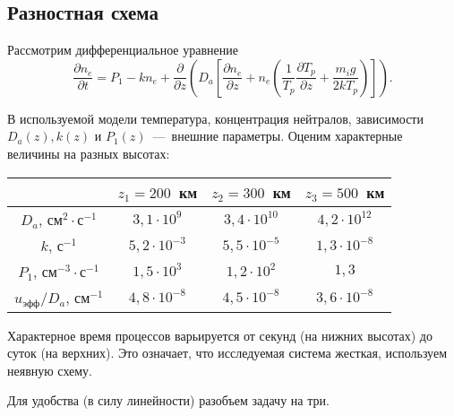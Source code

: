 \documentclass[12pt, a5paper, fleqn, twoside]{article}
\theoremstyle{definiton}
\theoremstyle{definition}
\begin{document}
\subsection*{Разностная схема}

Рассмотрим дифференциальное уравнение $$\dfrac{\partial n_e}{\partial t}=P_1-kn_e + \dfrac{\partial}{\partial z}\left(D_a\left[\dfrac{\partial n_e}{\partial z}+n_e\left(\dfrac{1}{T_p}\dfrac{\partial T_p}{\partial z}+\dfrac{m_ig}{2kT_p}\right)\right]\right).$$

В используемой модели температура, концентрация нейтралов, зависимости $D_a(z), k(z)$ и $P_1(z)$~---~внешние параметры. Оценим характерные величины на разных высотах:

\smallskip

\begin{tabular}{|c|c|c|c|}
\hline
&$z_1=200$~км&$z_2=300$~км&$z_3=500$~км\\
\hline
$D_a$, см$^{2}\cdot$с$^{-1}$&$3{,}1\cdot 10^9$&$3{,}4\cdot 10^{10}$&$4{,}2\cdot 10^{12}$\\
\hline
$k$, с$^{-1}$&$5{,}2\cdot 10^{-3}$&$5{,}5\cdot 10^{-5}$&$1{,}3\cdot 10^{-8}$\\
\hline
$P_1$, см$^{-3}\cdot$с$^{-1}$&$1{,}5\cdot 10^3$&$1{,}2\cdot 10^{2}$&$1{,}3$\\
\hline
$u_\textrm{эфф}/D_a$, см$^{-1}$&$4{,}8\cdot 10^{-8}$&$4{,}5\cdot 10^{-8}$&$3{,}6\cdot 10^{-8}$\\
\hline
\end{tabular}

\medskip

Характерное время процессов варьируется от секунд (на нижних высотах) до суток (на верхних). Это означает, что исследуемая система жесткая, используем неявную схему.

\medskip

Для удобства (в силу линейности) разобъем задачу на три.
\end{document}
